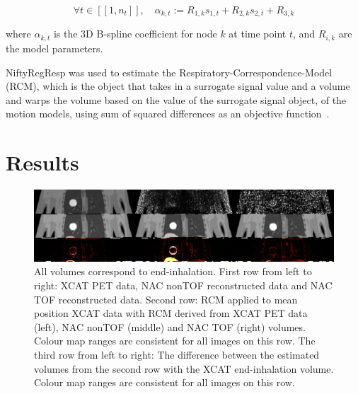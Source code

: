\documentclass[portrait,color=UCLburgundy,margin=3cm]{uclposter}
\begin{document}
\begin{multicols}{4}
\begin{equation}
    \forall t \in [[1,n_t]],\quad \alpha_{k,t} := R_{1,k} s_{1,t} + R_{2,k} s_{2,t} + R_{3,k}
\end{equation}

\noindent where $\alpha_{k,t}$ is the 3D B-spline coefficient for node $k$ at time point $t$, and $R_{i,k}$ are the model parameters. 

NiftyRegResp was used to estimate the Respiratory-Correspondence-Model (RCM), which is the object that takes in a surrogate signal value and a volume and warps the volume based on the value of the surrogate signal object, of the motion models, using sum of squared differences as an objective function~\cite{McClelland2017}.

\section*{Results}
\begin{figure}
    \centering
    \includegraphics[width=0.9\linewidth]{output_flipped.png}
    \caption{All volumes correspond to end-inhalation. First row from left to right: XCAT PET data, NAC nonTOF reconstructed data and NAC TOF reconstructed data. Second row: RCM applied to mean position XCAT data with RCM derived from XCAT PET data (left), NAC nonTOF (middle) and NAC TOF (right) volumes. Colour map ranges are consistent for all images on this row. The third row from left to right: The difference between the estimated volumes from the second row with the XCAT end-inhalation volume. Colour map ranges are consistent for all images on this row.}
    \label{fig:output}
\end{figure}


\end{multicols}
\end{document}

